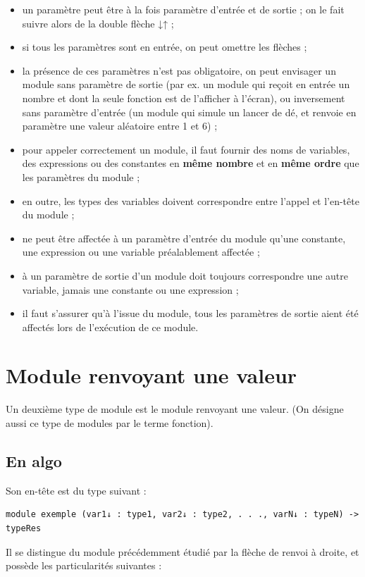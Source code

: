 \documentclass[11pt,a4paper]{article}
\begin{document}
					\begin{itemize}
				
			\item un param\`etre peut \^etre \`a la fois param\`etre d'entr\'ee et de sortie ; on le fait suivre alors de la double fl\`eche ↓↑ ;
			\item si tous les param\`etres sont en entr\'ee, on peut omettre les fl\`eches ;
			\item 
              la pr\'esence de ces param\`etres n'est pas obligatoire, on peut envisager un module sans
              param\`etre de sortie (par ex. un module qui re\c coit en entr\'ee un nombre et dont la seule
              fonction est de l'afficher \`a l'\'ecran), ou inversement sans param\`etre d'entr\'ee (un module
              qui simule un lancer de d\'e, et renvoie en param\`etre une valeur al\'eatoire entre 1 et 6) ;
            
			\item 
              pour appeler correctement un module, il faut fournir des noms de variables, des expressions ou des constantes 
              en \textbf{m\^eme nombre} et en \textbf{m\^eme ordre} 
              que les param\`etres du module ;
            
			\item en outre, les types des variables doivent correspondre entre l'appel et l'en-t\^ete du module ;
			\item ne peut \^etre affect\'ee \`a un param\`etre d'entr\'ee du module qu'une constante, une expression ou une variable pr\'ealablement affect\'ee ;
			\item \`a un param\`etre de sortie d'un module doit toujours correspondre une autre variable, jamais une constante ou une expression ;
			\item il faut s'assurer qu'\`a l'issue du module, tous les param\`etres de sortie aient \'et\'e affect\'es lors de l'ex\'ecution de ce module.
					\end{itemize}
				
            \par
        \section{Module renvoyant une valeur}Un deuxi\`eme type de module est le module renvoyant une valeur. 
    (On d\'esigne aussi ce type de modules par le terme fonction).\subsection{En algo}Son en-t\^ete est du type suivant :
            \par
        \begin{verbatim}
module exemple (var1↓ : type1, var2↓ : type2, . . ., varN↓ : typeN) -> typeRes
      \end{verbatim}
        Il se distingue du module pr\'ec\'edemment \'etudi\'e par la fl\`eche de renvoi \`a droite,
        et poss\`ede les particularit\'es suivantes :
      
\end{document}
